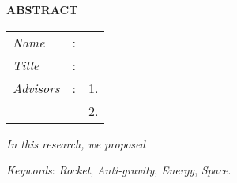 \begin{center}
  \large\textbf{ABSTRACT}
\end{center}


\vspace{2ex}

\begingroup
\setlength{\tabcolsep}{0pt}

\noindent
\begin{tabularx}{\textwidth}{l >{\centering}m{3em} X}
  \emph{Name}     & : & \name{}                                                             \\

  \emph{Title}    & : & \engtatitle{} \\

  \emph{Advisors} & : & 1. \advisor{}                                                       \\
                  &   & 2. \coadvisor{}                                                     \\
\end{tabularx}
\endgroup

\emph{In this research, we proposed \lipsum[1]}

\emph{Keywords}: \emph{Rocket}, \emph{Anti-gravity}, \emph{Energy}, \emph{Space}.
